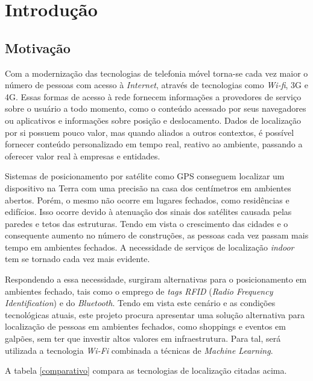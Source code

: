 \chapter{Introdução}\label{chp:introduction}

\section{Motivação}\label{sec:motivation}
Com a modernização das tecnologias de telefonia móvel torna-se cada vez maior o
número de pessoas com acesso à \textit{Internet}, através de tecnologias como \textit{Wi-fi}, 3G e 4G. Essas formas de acesso à rede fornecem informações a provedores de serviço sobre o usuário a todo momento, como o conteúdo acessado por seus navegadores ou aplicativos
e informações sobre posição e deslocamento. Dados de localização por si possuem
pouco valor, mas quando aliados a outros contextos, é possível fornecer conteúdo
personalizado em tempo real, reativo ao ambiente, passando a oferecer valor real à empresas e entidades.
\par
Sistemas de posicionamento por satélite como GPS conseguem localizar um dispositivo
na Terra com uma precisão na casa dos centímetros em ambientes abertos. Porém,
o mesmo não ocorre em lugares fechados, como residências e edifícios. Isso ocorre
devido à atenuação dos sinais dos satélites causada pelas paredes e tetos das
estruturas. Tendo em vista o crescimento das cidades e o consequente aumento no
número de construções, as pessoas cada vez passam mais tempo em ambientes
fechados. A necessidade de serviços de localização \textit{indoor} tem se tornado cada
vez mais evidente.
\par
Respondendo a essa necessidade, surgiram alternativas para o posicionamento em
ambientes fechado, tais como o emprego de \textit{tags RFID} (\textit{Radio Frequency Identification}) e do \textit{Bluetooth}. Tendo em vista este
cenário e as condições tecnológicas atuais, este projeto procura apresentar uma
solução alternativa para localização de pessoas em ambientes fechados, como shoppings e
eventos em galpões, sem ter que investir altos valores em infraestrutura. Para tal, será utilizada a tecnologia \textit{Wi-Fi} combinada a técnicas de \textit{Machine Learning}.
\par
A tabela \ref{comparativo} compara as tecnologias de localização citadas acima.


